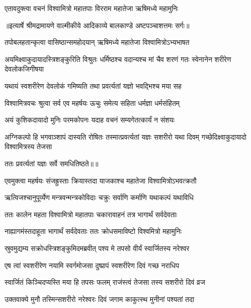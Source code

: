 \twolineshloka
{एतावदुक्त्वा वचनं विश्वामित्रो महातपाः}
{विरराम महातेजा ऋषिमध्ये महामुनिः} %


{॥इत्यार्षे श्रीमद्रामायणे वाल्मीकीये आदिकाव्ये बालकाण्डे अष्टपञ्चाशत्तमः सर्गः॥}


\twolineshloka
{तपोबलहतान्कृत्वा वासिष्ठान्समहोदयान्}
{ऋषिमध्ये महातेजा विश्वामित्रोऽभ्यभाषत} %

\threelineshloka
{अयमिक्ष्वाकुदायादस्त्रिशङ्कुरिति विश्रुतः}
{धर्मिष्ठश्च वदान्यश्च मां चैव शरणं गतः}
{स्वेनानेन शरीरेण देवलोकजिगीषया} %

\twolineshloka
{यथायं स्वशरीरेण देवलोकं गमिष्यति}
{तथा प्रवर्त्यतां यज्ञो भवद्भिश्च मया सह} %

\twolineshloka
{विश्वामित्रवचः श्रुत्वा सर्व एव महर्षयः}
{ऊचुः समेत्य सहिता धर्मज्ञा धर्मसंहितम्} %

\twolineshloka
{अयं कुशिकदायादो मुनिः परमकोपनः}
{यदाह वचनं सम्यगेतत्कार्यं न संशयः} %

\threelineshloka
{अग्निकल्पो हि भगवाञ्शापं दास्यति रोषितः}
{तस्मात्प्रवर्त्यतां यज्ञः सशरीरो यथा दिवम्}
{गच्छेदिक्ष्वाकुदायादो विश्वामित्रस्य तेजसा} %

{ततः प्रवर्त्यतां यज्ञः सर्वे समधितिष्ठते॥॥} %

\addtocounter{shlokacount}{1}

\twolineshloka
{एवमुक्त्वा महर्षयः संजह्रुस्ताः क्रियास्तदा}
{याजकाश्च महातेजा विश्वामित्रोऽभवत्क्रतौ} %

\twolineshloka
{ऋत्विजश्चानुपूर्व्येण मन्त्रवन्मन्त्रकोविदाः}
{चक्रुः सर्वाणि कर्माणि यथाकल्पं यथाविधि} %

\twolineshloka
{ततः कालेन महता विश्वामित्रो महातपाः}
{चकारावाहनं तत्र भागार्थं सर्वदेवताः} %

\twolineshloka
{नाह्यागमंस्तदाहूता भागार्थं सर्वदेवताः}
{ततः क्रोधसमाविष्टो विश्वमित्रो महामुनिः} %

\twolineshloka
{स्रुवमुद्यम्य सक्रोधस्त्रिशङ्कुमिदमब्रवीत्}
{पश्य मे तपसो वीर्यं स्वार्जितस्य नरेश्वर} %

\twolineshloka
{एष त्वां स्वशरीरेण नयामि स्वर्गमोजसा}
{दुष्प्रापं स्वशरीरेण दिवं गच्छ नराधिप} %

\twolineshloka
{स्वार्जितं किञ्चिदप्यस्ति मया हि तपसः फलम्}
{राजंस्त्वं तेजसा तस्य सशरीरो दिवं व्रज} %

\twolineshloka
{उक्तवाक्ये मुनौ तस्मिन्सशरीरो नरेश्वरः}
{दिवं जगाम काकुत्स्थ मुनीनां पश्यतां तदा} %

